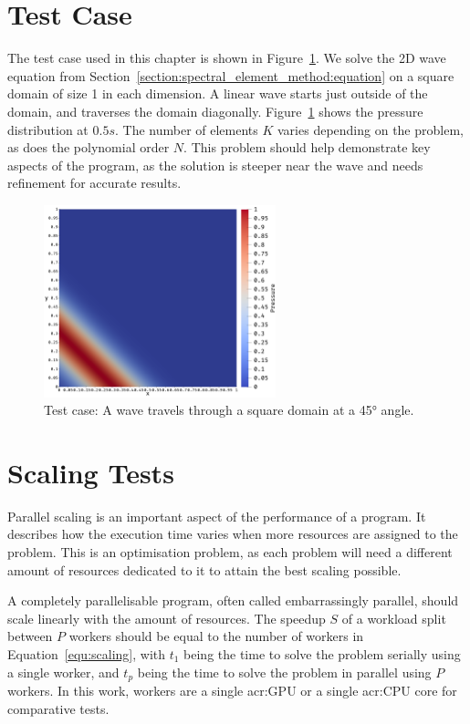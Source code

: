 \section{Test Case}\label{section:results:test_case}

The test case used in this chapter is shown in Figure~\ref{fig:problem}. We solve the 2D wave
equation from Section~\ref{section:spectral_element_method:equation} on a square domain of size 1 in
each dimension. A linear wave starts just outside of the domain, and traverses the domain
diagonally. Figure~\ref{fig:problem} shows the pressure distribution at \(0.5 s\). The number of
elements \( K \) varies depending on the problem, as does the polynomial order \( N \). This problem
should help demonstrate key aspects of the program, as the solution is steeper near the wave and
needs refinement for accurate results.

\begin{figure}[H]
    \centering
    \includegraphics[width=0.6\textwidth]{Chapter_results/media/problem_1}
    \caption{Test case: A wave travels through a square domain at a 45° angle.}\label{fig:problem}
\end{figure}

\section{Scaling Tests}\label{section:results:scaling_tests}

Parallel scaling is an important aspect of the performance of a program. It describes how the
execution time varies when more resources are assigned to the problem. This is an optimisation
problem, as each problem will need a different amount of resources dedicated to it to attain the
best scaling possible. 

A completely parallelisable program, often called embarrassingly parallel, should scale linearly
with the amount of resources. The speedup \(S\) of a workload split between \(P\) workers should be
equal to the number of workers in Equation~\ref{equ:scaling}, with \(t_1\) being the time to solve
the problem serially using a single worker, and \(t_p\) being the time to solve the problem in
parallel using \(P\) workers. In this work, workers are a single \acrshort{acr:GPU} or a single
\acrshort{acr:CPU} core for comparative tests.

